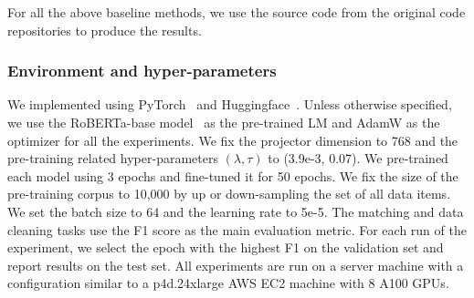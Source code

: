 

For all the above baseline methods, we use the source code from the original code repositories to produce the results.










\subsubsection{Environment and hyper-parameters}

We implemented \system using PyTorch~\cite{DBLP:conf/nips/PaszkeGMLBCKLGA19} and Huggingface~\cite{DBLP:conf/emnlp/WolfDSCDMCRLFDS20}.
Unless otherwise specified, 
we use the RoBERTa-base model~\cite{DBLP:journals/corr/abs-1907-11692} as the pre-trained LM and AdamW as the optimizer for all the experiments.
We fix the projector dimension to 768 and the pre-training related 
hyper-parameters $(\lambda, \tau)$ to (3.9e-3, 0.07).
We pre-trained each model using 3 epochs and fine-tuned it for 50 epochs. We fix the size of the pre-training corpus to 10,000
by up or down-sampling the set of all data items.
We set the batch size to 64 and the learning rate to 5e-5.
The matching and data cleaning tasks use the F1 score as the main evaluation metric. 
For each run of the experiment, we select the epoch with the highest F1 on the validation set and report results on the test set.
All experiments are run on a server machine with a configuration similar to 
a p4d.24xlarge AWS EC2 machine with 8 A100 GPUs.

